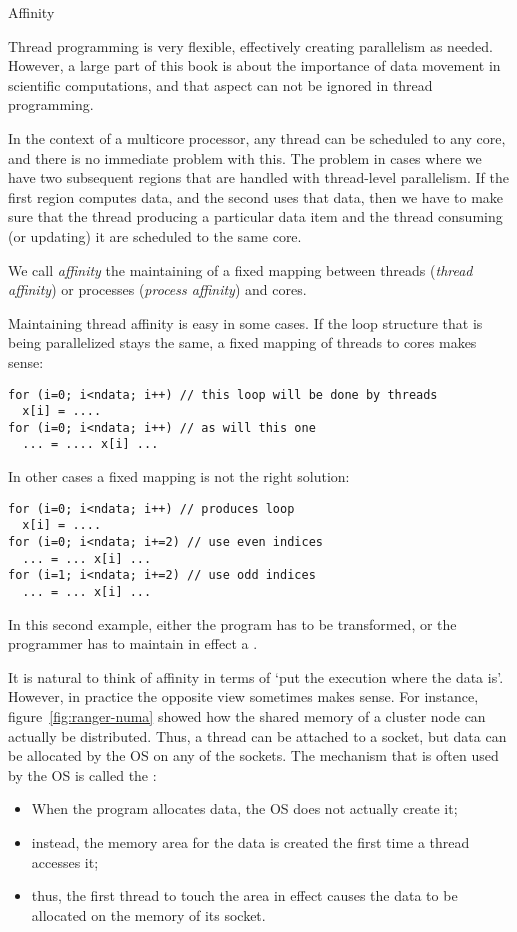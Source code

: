  {Affinity}

Thread programming is very flexible, effectively creating parallelism
as needed. However, a large part of this book is about the importance
of data movement in scientific computations, and that aspect can not
be ignored in thread programming.

In the context of a multicore processor, any thread can be scheduled
to any core, and there is no immediate problem with this. The problem
in cases where we have two subsequent regions that are handled with
thread-level parallelism. If the first region computes data, and the
second uses that data, then we have to make sure that the thread
producing a particular data item and the thread consuming (or
updating) it are scheduled to the same core.

We call \emph{affinity} the maintaining of a fixed mapping between
threads (\emph{thread affinity})
or processes (\emph{process
  affinity}) and cores.

Maintaining thread affinity is easy in some cases. If the loop
structure that is being parallelized stays the same, a fixed mapping
of threads to cores makes sense:
\begin{verbatim}
for (i=0; i<ndata; i++) // this loop will be done by threads
  x[i] = ....
for (i=0; i<ndata; i++) // as will this one
  ... = .... x[i] ...
\end{verbatim}
In other cases a fixed mapping is not the right solution:
\begin{verbatim}
for (i=0; i<ndata; i++) // produces loop
  x[i] = ....
for (i=0; i<ndata; i+=2) // use even indices
  ... = ... x[i] ...
for (i=1; i<ndata; i+=2) // use odd indices
  ... = ... x[i] ...
\end{verbatim}
In this second example, either the program has to be transformed, or
the programmer has to maintain in effect a .

It is natural to think of affinity in terms of `put the
execution where the data is'. However, in practice the opposite view
sometimes makes sense.  For instance, figure~\ref{fig:ranger-numa}
showed how the shared memory of a cluster node can actually be
distributed. Thus, a thread can be attached to a socket, but data can
be allocated by the \ac{OS} on any of the sockets.  The mechanism that
is often used by the \ac{OS} is called the :
\begin{itemize}
\item When the program allocates data, the \ac{OS} does not actually
  create it;
\item instead, the memory area for the data is created the first
  time a thread accesses it;
\item thus, the first thread to touch the area in effect causes the
  data to be allocated on the memory of its socket.
\end{itemize}

